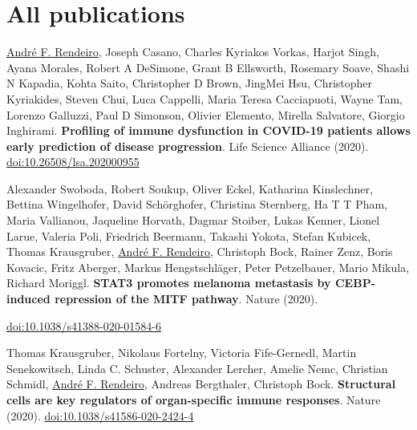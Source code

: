 \documentclass[11pt,a4paper,roman]{moderncv} %
\begin{document}
\newpage

\section{All publications}
        \begin{etaremune}[leftmargin=1.0cm, itemindent=0pt, topsep=10pt, itemsep=2pt, partopsep=0pt, parsep=0pt]
    
        \item \underline{André F. Rendeiro}, Joseph Casano, Charles Kyriakos Vorkas, Harjot Singh, Ayana Morales, Robert A DeSimone, Grant B Ellsworth, Rosemary Soave, Shashi N Kapadia, Kohta Saito, Christopher D Brown, JingMei Hsu, Christopher Kyriakides, Steven Chui, Luca Cappelli, Maria Teresa Cacciapuoti, Wayne Tam, Lorenzo Galluzzi, Paul D Simonson, Olivier Elemento, Mirella Salvatore, Giorgio Inghirami. \textbf{Profiling of immune dysfunction in COVID-19 patients allows early prediction of disease progression}. Life Science Alliance (2020). \href{https://dx.doi.org/10.26508/lsa.202000955}{doi:10.26508/lsa.202000955}

        \item Alexander Swoboda, Robert Soukup, Oliver Eckel, Katharina Kinslechner, Bettina Wingelhofer, David Schörghofer, Christina Sternberg, Ha T T Pham, Maria Vallianou, Jaqueline Horvath, Dagmar Stoiber, Lukas Kenner, Lionel Larue, Valeria Poli, Friedrich Beermann, Takashi Yokota, Stefan Kubicek, Thomas Krausgruber, \underline{André F. Rendeiro}, Christoph Bock, Rainer Zenz, Boris Kovacic, Fritz Aberger, Markus Hengstschläger, Peter Petzelbauer, Mario Mikula, Richard Moriggl. \textbf{STAT3 promotes melanoma metastasis by CEBP-induced repression of the MITF pathway}. Nature (2020).

        \href{https://dx.doi.org/10.1038/s41388-020-01584-6}{doi:10.1038/s41388-020-01584-6}
        \item Thomas Krausgruber, Nikolaus Fortelny, Victoria Fife-Gernedl, Martin Senekowitsch, Linda C. Schuster, Alexander Lercher, Amelie Nemc, Christian Schmidl, \underline{André F. Rendeiro}, Andreas Bergthaler, Christoph Bock. \textbf{Structural cells are key regulators of organ-specific immune responses}. Nature (2020).
        \href{https://dx.doi.org/10.1038/s41586-020-2424-4}{doi:10.1038/s41586-020-2424-4}


\end{etaremune}
\end{document}
